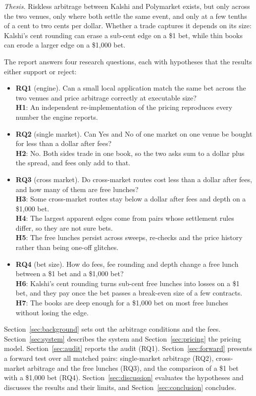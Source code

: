 \documentclass[5p,letterpaper]{elsarticle}
\begin{document}
\medskip
\noindent\emph{Thesis.} Riskless arbitrage between Kalshi and Polymarket exists, but only across the two venues, only where both settle the same event, and only at a few tenths of a cent to two cents per dollar. Whether a trade captures it depends on its size: Kalshi's cent rounding can erase a sub-cent edge on a \$1 bet, while thin books can erode a larger edge on a \$1,000 bet.
\medskip

\noindent The report answers four research questions, each with hypotheses that the results either support or reject:
\begin{itemize}
\item \textbf{RQ1} (engine). Can a small local application match the same bet across the two venues and price arbitrage correctly at executable size?\\
\textbf{H1}: An independent re-implementation of the pricing reproduces every number the engine reports.
\item \textbf{RQ2} (single market). Can Yes and No of one market on one venue be bought for less than a dollar after fees?\\
\textbf{H2}: No. Both sides trade in one book, so the two asks sum to a dollar plus the spread, and fees only add to that.
\item \textbf{RQ3} (cross market). Do cross-market routes cost less than a dollar after fees, and how many of them are free lunches?\\
\textbf{H3}: Some cross-market routes stay below a dollar after fees and depth on a \$1,000 bet.\\
\textbf{H4}: The largest apparent edges come from pairs whose settlement rules differ, so they are not sure bets.\\
\textbf{H5}: The free lunches persist across sweeps, re-checks and the price history rather than being one-off glitches.
\item \textbf{RQ4} (bet size). How do fees, fee rounding and depth change a free lunch between a \$1 bet and a \$1,000 bet?\\
\textbf{H6}: Kalshi's cent rounding turns sub-cent free lunches into losses on a \$1 bet, and they pay once the bet passes a break-even size of a few contracts.\\
\textbf{H7}: The books are deep enough for a \$1,000 bet on most free lunches without losing the edge.
\end{itemize}

Section~\ref{sec:background} sets out the arbitrage conditions and the fees. Section~\ref{sec:system} describes the system and Section~\ref{sec:pricing} the pricing model. Section~\ref{sec:audit} reports the audit (RQ1). Section~\ref{sec:forward} presents a forward test over all matched pairs: single-market arbitrage (RQ2), cross-market arbitrage and the free lunches (RQ3), and the comparison of a \$1 bet with a \$1,000 bet (RQ4). Section~\ref{sec:discussion} evaluates the hypotheses and discusses the results and their limits, and Section~\ref{sec:conclusion} concludes.
\end{document}
